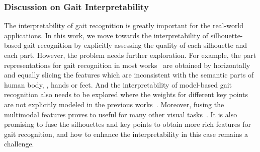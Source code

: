 \subsubsection{Discussion on Gait Interpretability}
The interpretability of gait recognition is greatly important for the real-world applications.
%
In this work, we move towards the interpretability of silhouette-based gait recognition by explicitly assessing the quality of each silhouette and each part.
%
However, the problem needs further exploration.
%
For example, the part representations for gait recognition in most works~\cite{chao2019gaitset,fan2020gaitpart,hou2020gait} are obtained by horizontally and equally slicing the features which are inconsistent with the semantic parts of human body, \eg, hands or feet.
%
And the interpretability of model-based gait recognition also needs to be explored where the weights for different key points are not explicitly modeled in the previous works~\cite{liao2020model,li2020end}.
%
Moreover, fusing the multimodal features proves to useful for many other visual tasks~\cite{zhang2020advances,zhang2021improved}.
%
It is also promising to fuse the silhouettes and key points to obtain more rich features for gait recognition, and how to enhance the interpretability in this case remains a challenge.

\ifx\allfiles\undefined

\fi
